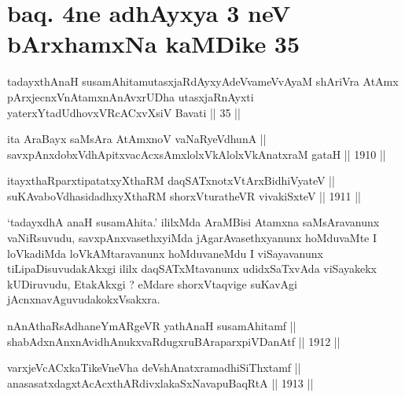 \section*{baq. 4ne adhAyxya 3 neV bArxhamxNa kaMDike 35}

\begin{shl}
tadayxthAnaH susamAhitamutasxjaRdAyxyAdeVvameVvAyaM shAriVra AtAmx pArxjecnxVnAtamxnAnAvxrUDha utasxjaRnAyxti yaterxYtadUdhovxVRcACxvXsiV Bavati || 35 ||
\end{shl}


\begin{shl}
ita AraBayx saMsAra AtAmxnoV vaNaRyeV\s dhunA ||  \\
savxpAnxdobxVdhApitxvacAcxsAmxlolxVkAlolxVkAnatxraM gataH \hfill || 1910 ||
  
\end{shl}

\begin{shl}
itayxthaRparxtipatatxyXthaRM daqSATxnotxV\s tArxBidhiVyateV || \\
suKAvaboVdhasidadhxyXthaRM shorxVturatheVR vivakiSxteV \hfill || 1911 ||
  
\end{shl}

\begin{artha}
`tadayxdhA anaH susamAhita.' ililxMda AraMBisi Atamxna saMsAravanunx vaNiRsuvudu,
savxpAnxvasethxyiMda jAgarAvasethxyanunx hoMduvaMte I loVkadiMda
loVkAMtaravanunx hoMduvaneMdu I viSayavanunx tiLipaDisuvudakAkxgi
ililx daqSATxMtavanunx udidxSaTxvAda viSayakekx kUDiruvudu,
EtakAkxgi ? eMdare shorxVtaqvige suKavAgi jAcnxnavAguvudakokxVsakxra.
\end{artha}


\begin{shl}
nAnAthaRsAdhaneYmARgeVR yathA\s naH susamAhitamf || \\
shabAdxnAnxnAvidhAnukxvaRdugxruBAraparxpiVDanAtf \hfill || 1912 ||
  
\end{shl}

\begin{shl}
varxjeVcACxkaTikeVneVha deVshAnatxramadhiSiThxtamf || \\
anasasatxdagxtAcAcxthARdivxlakaSxNavapuBaqRtA \hfill || 1913 ||
  
\end{shl}

